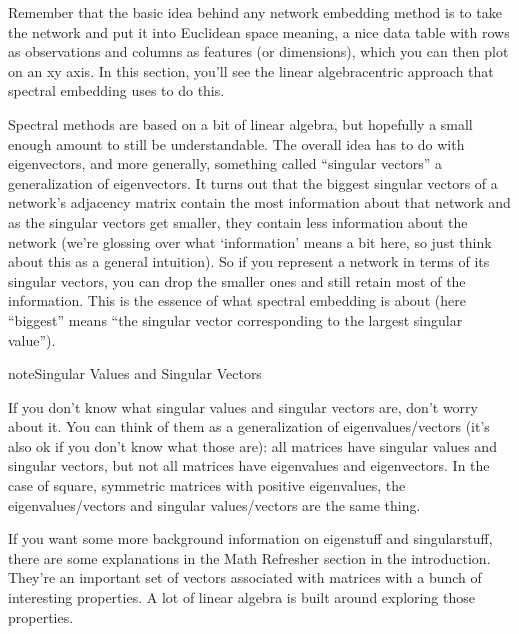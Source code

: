 \documentclass[letterpaper,10pt,english]{jupyterBook}
\begin{document}
\sphinxAtStartPar
Remember that the basic idea behind any network embedding method is to take the network and put it into Euclidean space \sphinxhyphen{} meaning, a nice data table with rows as observations and columns as features (or dimensions), which you can then plot on an x\sphinxhyphen{}y axis. In this section, you’ll see the linear algebra\sphinxhyphen{}centric approach that spectral embedding uses to do this.

\sphinxAtStartPar
Spectral methods are based on a bit of linear algebra, but hopefully a small enough amount to still be understandable. The overall idea has to do with eigenvectors, and more generally, something called “singular vectors” \sphinxhyphen{} a generalization of eigenvectors. It turns out that the biggest singular vectors of a network’s adjacency matrix contain the most information about that network \sphinxhyphen{} and as the singular vectors get smaller, they contain less information about the network (we’re glossing over what ‘information’ means a bit here, so just think about this as a general intuition). So if you represent a network in terms of its singular vectors, you can drop the smaller ones and still retain most of the information. This is the essence of what spectral embedding is about (here “biggest” means “the singular vector corresponding to the largest singular value”).

\begin{sphinxadmonition}{note}{Singular Values and Singular Vectors}

\sphinxAtStartPar
If you don’t know what singular values and singular vectors are, don’t worry about it. You can think of them as a generalization of eigenvalues/vectors (it’s also ok if you don’t know what those are): all matrices have singular values and singular vectors, but not all matrices have eigenvalues and eigenvectors. In the case of square, symmetric matrices with positive eigenvalues, the eigenvalues/vectors and singular values/vectors are the same thing.

\sphinxAtStartPar
If you want some more background information on eigenstuff and singularstuff, there are some explanations in the Math Refresher section in the introduction. They’re an important set of vectors associated with matrices with a bunch of interesting properties. A lot of linear algebra is built around exploring those properties.
\end{sphinxadmonition}
\end{document}
